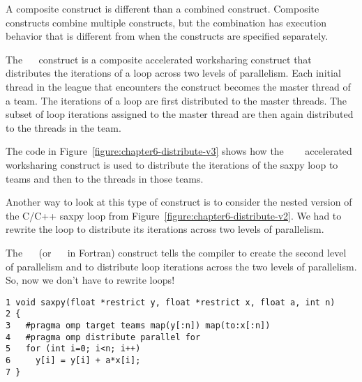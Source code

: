 A composite construct is different than a combined construct.  
Composite constructs combine multiple constructs, but the combination has
execution behavior that is different from when the constructs are specified
separately.  

The ~~ construct is a composite
accelerated worksharing construct that distributes the iterations of a loop
across two levels of parallelism.  Each initial thread in the league that
encounters the construct becomes the master thread of a team.  The iterations
of a loop are first distributed to the master threads.  The subset of loop
iterations assigned to the master thread are then again distributed to the
threads in the team.

The code in Figure~\ref{figure:chapter6-distribute-v3} shows how the
~~~ accelerated worksharing
construct is used to distribute the iterations of the saxpy loop to 
teams and then to the threads in those teams.

Another way to look at this type of construct is to consider the nested version
of the C/C++ saxpy loop from Figure~\ref{figure:chapter6-distribute-v2}.  We had
to rewrite the loop to distribute its iterations across two levels of
parallelism.

The ~~ (or
~~ in Fortran) construct tells the
compiler to create the second level of parallelism and to distribute loop
iterations across the two levels of parallelism.  So, now we don't have to
rewrite loops!

\begin{figure*}[!tbh]
\begin{verbatim}
1 void saxpy(float *restrict y, float *restrict x, float a, int n)
2 {
3   #pragma omp target teams map(y[:n]) map(to:x[:n]) 
4   #pragma omp distribute parallel for
5   for (int i=0; i<n; i++)
6     y[i] = y[i] + a*x[i];
7 }
\end{verbatim}
\caption{ \textbf {Example of the distribute parallel loop accelerated 
                   worksharing construct} -- \small
          Create multiple thread teams executing in parallel.
          Distribute loop iterations to the teams and then
          to the threads in each team.
         }
\label{figure:chapter6-distribute-v3}
\end{figure*}


